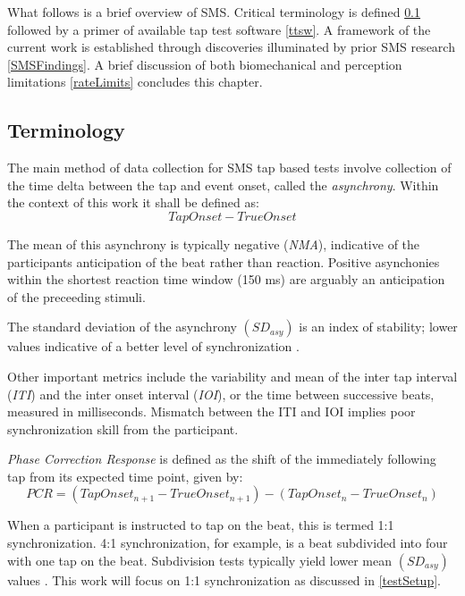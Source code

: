 What follows is a brief overview of SMS. Critical terminology is defined \ref{SMSTerms} followed by a primer of available tap test software \ref{ttsw}. A framework of the current work is established through discoveries illuminated by prior SMS research \ref{SMSFindings}. A brief discussion of both biomechanical and perception limitations \ref{rateLimits} concludes this chapter.

\subsection{Terminology} \label{SMSTerms}
The main method of data collection for SMS tap based tests involve collection of the time delta between the tap and event onset, called the \textit{asynchrony}. Within the context of this work it shall be defined as:
\begin{equation*}
    Tap Onset-True Onset
\end{equation*} 

The mean of this asynchrony is typically negative (\textit{NMA}), indicative of the participants anticipation of the beat rather than reaction. Positive asynchonies within the shortest reaction time window (150 ms) are arguably an anticipation of the preceeding stimuli. 

The standard deviation of the asynchrony $(SD_{asy})$ is an index of stability; lower values indicative of a better level of synchronization \cite{repp2013sensorimotor}.

Other important metrics include the variability and mean of the inter tap interval (\textit{ITI}) and the inter onset interval (\textit{IOI}), or the time between successive beats, measured in milliseconds. Mismatch between the ITI and IOI implies poor synchronization skill from the participant. 

\textit{Phase Correction Response} is defined as the shift of the immediately following tap from its expected time point, given by:
\begin{equation*}
    PCR = (Tap Onset_{n+1} - True Onset_{n+1})-(Tap Onset_{n} - True Onset_{n})
\end{equation*}

When a participant is instructed to tap on the beat, this is termed 1:1 synchronization. 4:1 synchronization, for example, is a beat subdivided into four with one tap on the beat. Subdivision tests typically yield lower mean $(SD_{asy})$ values \cite{repp2013sensorimotor}. This work will focus on 1:1 synchronization as discussed in \ref{testSetup}.

